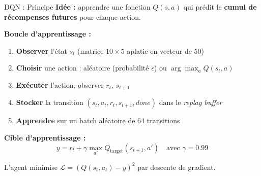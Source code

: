 \documentclass[10pt]{beamer}
\begin{document}
\begin{frame}{DQN : Principe}
    \textbf{Id\'ee :} apprendre une fonction $Q(s, a)$ qui pr\'edit le \textbf{cumul de r\'ecompenses futures} pour chaque action.

    \vspace{0.3cm}
    \textbf{Boucle d'apprentissage :}
    \begin{enumerate}
        \item \textbf{Observer} l'\'etat $s_t$ (matrice $10 \times 5$ aplatie en vecteur de 50)
        \item \textbf{Choisir} une action : al\'eatoire (probabilit\'e $\epsilon$) ou $\arg\max_a Q(s_t, a)$
        \item \textbf{Ex\'ecuter} l'action, observer $r_t$, $s_{t+1}$
        \item \textbf{Stocker} la transition $(s_t, a_t, r_t, s_{t+1}, done)$ dans le \textit{replay buffer}
        \item \textbf{Apprendre} sur un batch al\'eatoire de 64 transitions
    \end{enumerate}

    \vspace{0.3cm}
    \textbf{Cible d'apprentissage :}
    $$y = r_t + \gamma \max_{a'} Q_{\text{target}}(s_{t+1}, a') \quad \text{avec } \gamma = 0.99$$

    L'agent minimise $\mathcal{L} = (Q(s_t, a_t) - y)^2$ par descente de gradient.
\end{frame}
\end{document}
